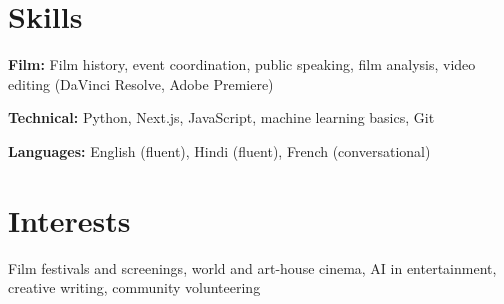 \documentclass[letterpaper,11pt]{article}
\begin{document}
\section{Skills}
\begin{itemize}[leftmargin=0.15in, label={}]
  \small{
    \item \textbf{Film:} Film history, event coordination, public speaking, film analysis, video editing (DaVinci Resolve, Adobe Premiere)
    \item \textbf{Technical:} Python, Next.js, JavaScript, machine learning basics, Git
    \item \textbf{Languages:} English (fluent), Hindi (fluent), French (conversational)
  }
\end{itemize}

\section{Interests}
\begin{itemize}[leftmargin=0.15in, label={}]
  \small{
    \item Film festivals and screenings, world and art-house cinema, AI in entertainment, creative writing, community volunteering
  }
\end{itemize}
\end{document}
